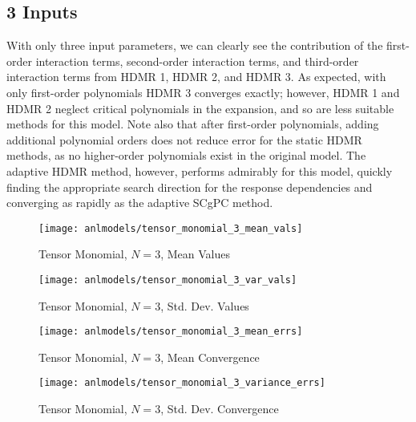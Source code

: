 \subsection{3 Inputs}
With only three input parameters, we can clearly see the contribution of the first-order interaction terms,
second-order interaction terms, and third-order interaction terms from HDMR 1, HDMR 2, and HDMR 3.  As
expected, with only first-order polynomials HDMR 3 converges exactly; however, HDMR 1 and HDMR 2 neglect
critical polynomials in the expansion, and so are less suitable methods for this model.  Note also that after
first-order polynomials, adding additional polynomial orders does not reduce error for the static HDMR
methods, as no higher-order polynomials exist in the original model.
The adaptive HDMR method, however, performs admirably for this model, quickly finding the appropriate search
direction for the response dependencies and converging as rapidly as the adaptive SCgPC method.
\begin{figure}[H]
  \centering
  \texttt{[image: anlmodels/tensor\_monomial\_3\_mean\_vals]}
  \caption{Tensor Monomial, $N=3$, Mean Values}
  \label{fig:hdmr tensormono mean values 3}
\end{figure}
\begin{figure}[H]
  \centering
  \texttt{[image: anlmodels/tensor\_monomial\_3\_var\_vals]}
  \caption{Tensor Monomial, $N=3$, Std. Dev. Values}
  \label{fig:hdmr tensormono var values 3}
\end{figure}

\begin{figure}[H]
  \centering
  \texttt{[image: anlmodels/tensor\_monomial\_3\_mean\_errs]}
  \caption{Tensor Monomial, $N=3$, Mean Convergence}
  \label{fig:hdmr tensormono mean errors 3}
\end{figure}
\begin{figure}[H]
  \centering
  \texttt{[image: anlmodels/tensor\_monomial\_3\_variance\_errs]}
  \caption{Tensor Monomial, $N=3$, Std. Dev. Convergence}
  \label{fig:hdmr tensormono var errors 3}
\end{figure}




